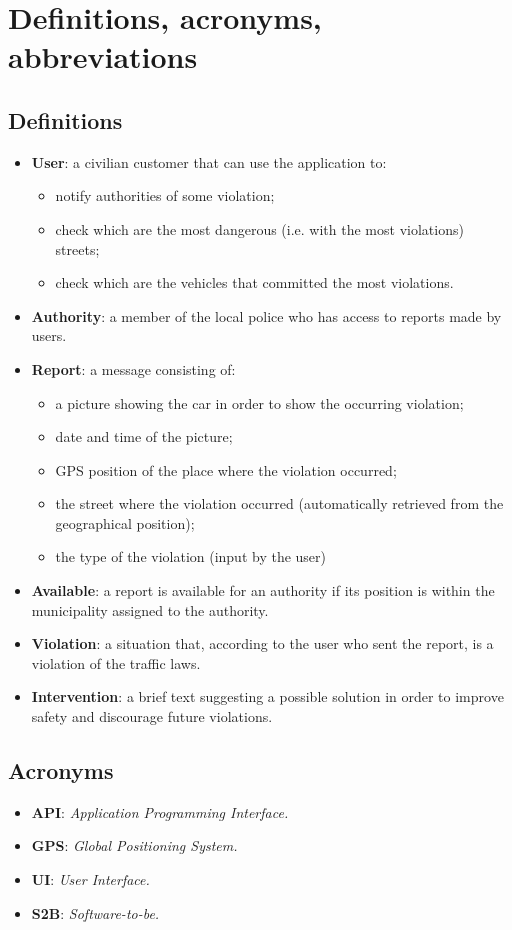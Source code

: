 \documentclass[12pt,a4paper]{report}
\begin{document}
	\section{Definitions, acronyms, abbreviations}
		\subsection{Definitions}
		\begin{itemize}
		\item \textbf{User}: a civilian customer that can use the application to:
			\begin{itemize}
			\item notify authorities of some violation;
			\item check which are the most dangerous (i.e. with the most violations) streets;
			\item check which are the vehicles that committed the most violations.
			\end{itemize}
		\item \textbf{Authority}: a member of the local police who has access to reports made by users.
		\item \textbf{Report}: a message consisting of:
			\begin{itemize}
			\item a picture showing the car in order to show the occurring violation;
			\item date and time of the picture;
			\item GPS position of the place where the violation occurred;
			\item the street where the violation occurred (automatically retrieved from the geographical position);
			\item the type of the violation (input by the user)
			\end{itemize}
		\item \textbf{Available}: a report is available for an authority if its position is within the municipality assigned to the authority.
		\item \textbf{Violation}: a situation that, according to the user who sent the report, is a violation of the traffic laws.
		\item \textbf{Intervention}: a brief text suggesting a possible solution in order to improve safety and discourage future violations.
		\end{itemize}
		\subsection{Acronyms}
			\begin{itemize}
			\item \textbf{API}: \emph{Application Programming Interface.}
			\item \textbf{GPS}: \emph{Global Positioning System.}
			\item \textbf{UI}: \emph{User Interface.}		
			\item \textbf{S2B}: \emph{Software-to-be.}	
			\end{itemize}
\end{document}
